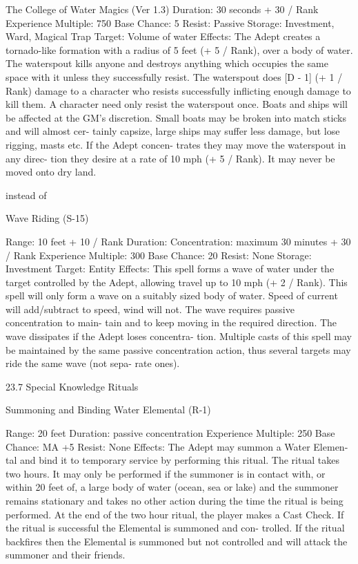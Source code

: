 \begin{Chapter}{The College of Water Magics (Ver 1.3)}
Duration: 30 seconds + 30 / Rank 
Experience Multiple: 750 
Base Chance: 5%
Resist: Passive 
Storage: Investment, Ward, Magical Trap 
Target: Volume of water 
Effects: The Adept creates a tornado-like formation 
with a radius of 5 feet (+ 5 / Rank), over a body of 
water.  The  waterspout  kills  anyone  and  destroys 
anything  which  occupies  the  same  space  with  it 
unless  they  successfully  resist.  The  waterspout 
does  [D  -  1]  (+  1  /  Rank)  damage  to  a  character 
who  resists  successfully 
inflicting 
enough damage to kill them. A character need only 
resist the waterspout once. Boats and ships will be 
affected  at  the  GM’s  discretion.  Small  boats  may 
be  broken  into  match  sticks  and  will  almost  cer-
tainly capsize, large ships may suffer less damage, 
but  lose  rigging,  masts  etc.  If  the  Adept  concen-
trates they may move the  waterspout in any direc-
tion they desire at a rate of 10 mph (+ 5 / Rank). It 
may never be moved onto dry land. 

instead  of 

Wave Riding (S-15) 

Range: 10 feet + 10 / Rank 
Duration:  Concentration:  maximum  30  minutes  + 
30 / Rank 
Experience Multiple: 300 
Base Chance: 20%
Resist: None 
Storage: Investment 
Target: Entity 
Effects: This spell forms a wave of water under the 
target  controlled  by  the  Adept,  allowing  travel  up 
to 10 mph (+ 2 / Rank). This spell will only form a 
wave  on  a  suitably  sized  body  of  water.  Speed  of 
current  will  add/subtract  to  speed,  wind  will  not. 
The  wave  requires  passive  concentration  to  main-
tain  and  to  keep  moving  in  the  required  direction. 
The  wave  dissipates  if  the  Adept  loses  concentra-
tion. Multiple casts of this spell may be maintained 
by  the  same  passive  concentration  action,  thus 
several  targets  may  ride  the  same  wave  (not  sepa-
rate ones). 

23.7 Special Knowledge Rituals  

Summoning and Binding Water Elemental 
(R-1)  

Range: 20 feet 
Duration: passive concentration 
Experience Multiple: 250 
Base Chance: MA +5%
Resist: None 
Effects: The Adept may summon a Water Elemen-
tal and bind it to temporary service by performing 
this  ritual.  The  ritual takes  two  hours.  It  may  only 
be performed if the summoner is in contact with, or 
within 20 feet of, a large body of water (ocean, sea 
or  lake)  and the  summoner  remains  stationary  and 
takes  no  other  action  during  the  time  the  ritual  is 
being performed. At the end of the two hour ritual, 
the  player  makes  a  Cast  Check.  If  the  ritual  is 
successful  the  Elemental  is  summoned  and  con-
trolled. If the ritual backfires then the Elemental is 
summoned  but  not  controlled  and  will  attack  the 
summoner and their friends. 


\end{Chapter}

